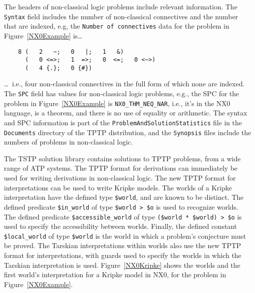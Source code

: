 \documentclass[runningheads]{llncs}
\begin{document}
The headers of non-classical logic problems include relevant information.
The {\tt Syntax} field includes the number of non-classical connectives and the 
number that are indexed, e.g,
the {\tt Number of connectives} data for the problem in Figure~\ref{NX0Example} is\ldots
\begin{verbatim}
    8 (   2   ~;   0   |;   1   &)
      (   0 <=>;   1  =>;   0  <=;   0 <~>)
      (   4 {.};   0 {#})
\end{verbatim}
\ldots~i.e., four non-classical connectives in the full form of which none are indexed.
The {\tt SPC} field has values for non-classical logic problems, e.g., the SPC for the problem 
in Figure~\ref{NX0Example} is {\tt NX0\_THM\_NEQ\_NAR}, i.e., it's in the NX0 language, is
a theorem, and there is no use of equality or arithmetic.
The syntax and SPC information is part of the {\tt ProblemAndSolutionStatistics} file in the 
{\tt Documents} directory of the TPTP distribution, and the {\tt Synopsis} files include
the numbers of problems in non-classical logic.

The TSTP solution library \cite{Sut07-CSR} contains solutions to TPTP problems, from a wide range
of ATP systems.
The TPTP format for derivations \cite{SS+06} can immediately be used for writing derivations in
non-classical logic.
The new TPTP format for interpretations \cite{SS+23-LPAR} can be used to write Kripke models.
The worlds of a Kripke interpretation have the defined type {\tt \$world}, and are known to 
be distinct.
The defined predicate {\tt \$in\_world} of type {\tt \$world~>~\$o} is used to recognize 
worlds.
The defined predicate {\tt \$access\-ible\_world} of type {\tt (\$world~*~\$world)~>~\$o} is
used to specify the accessibility between worlds.
Finally, the defined constant {\tt \$local\_world} of type {\tt \$world} is the world in
which a problem's conjecture must be proved. 
The Tarskian interpretations within worlds also use the new TPTP format for interpretations,
with guards used to specify the worlds in which the Tarskian interpretation is used.
Figure~\ref{NX0Kripke} shows the worlds and the first world's interpretation for a Kripke
model in NX0, for the problem in Figure~\ref{NX0Example}.
\end{document}
